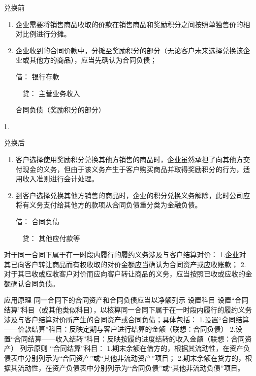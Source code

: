 \documentclass[UTF8,12pt]{ctexart}
\newenvironment{Dr}{\noindent 借：}{\par}
\newenvironment{Cr}{\noindent \ \ 贷：}{\par}
\numberwithin{equation}{section} %
\numberwithin{figure}{section}
\numberwithin{table}{section}
\begin{document}
	兑换前
	\begin{enumerate}
		\item 企业需要将销售商品收取的价款在销售商品和奖励积分之间按照单独售价的相对比例进行分摊。
		
		\item 企业收到的合同价款中，分摊至奖励积分的部分（无论客户未来选择兑换该企业或其他方的商品），应当先确认为合同负债；
		
		\begin{Dr}
			银行存款
		\end{Dr}
		\begin{Cr}
			主营业务收入
			
			合同负债（奖励积分的部分）
		\end{Cr}
	\end{enumerate}	1.

	兑换后	
	\begin{enumerate}
		\item 客户选择使用奖励积分兑换其他方销售的商品时，企业虽然承担了向其他方交付现金的义务，但由于该义务产生于客户购买商品并取得奖励积分的行为，适用收入准则进行会计处理。
		
		\item 到客户选择兑换其他方销售的商品时，企业的积分兑换义务解除，此时公司应将有义务支付给其他方的款项从合同负债重分类为金融负债。
		
		\begin{Dr}
			合同负债
		\end{Dr}
		\begin{Cr}
			其他应付款等
		\end{Cr}
	\end{enumerate}

	对于同一合同下属于在一时段内履行的履约义务涉及与客户结算对价：
	1.企业对其已向客户转让商品而有权收取的对价金额应当确认为合同资产或应收账款；
	2.对于其已收或应收客户对价而应向客户转让商品的义务，应当按照已收或应收的金额确认合同负债。
	
	应用原理	同一合同下的合同资产和合同负债应当以净额列示
	设置科目	设置“合同结算”科目（或其他类似科目），以核算同一合同下属于在一时段内履行的履约义务涉及与客户结算对价所产生的合同资产或合同负债；具体包括：
	1.设置“合同结算——价款结算”科目：反映定期与客户进行结算的金额（联想：合同负债）
	2.设置“合同结算——收入结转”科目：反映按履约进度结转的收入金额（联想：合同资产）
	列示原则	“合同结算”科目：
	1.期末余额在借方的，根据其流动性，在资产负债表中分别列示为“合同资产”或“其他非流动资产”项目；
	2.期末余额在贷方的，根据其流动性，在资产负债表中分别列示为“合同负债”或“其他非流动负债”项目。
	
\end{document}
